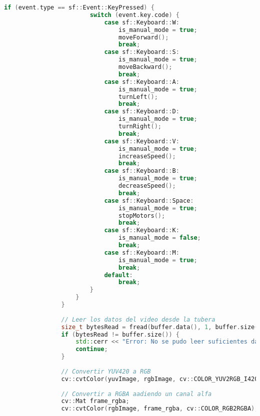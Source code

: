 \begin{lstlisting}[language={C++}, caption={Primer ajuste de c\'odigo}, label={Script}]
                    if (event.type == sf::Event::KeyPressed) {
                        switch (event.key.code) {
                            case sf::Keyboard::W:
                                is_manual_mode = true;
                                moveForward();
                                break;
                            case sf::Keyboard::S:
                                is_manual_mode = true;
                                moveBackward();
                                break;
                            case sf::Keyboard::A:
                                is_manual_mode = true;
                                turnLeft();
                                break;
                            case sf::Keyboard::D:
                                is_manual_mode = true;
                                turnRight();
                                break;
                            case sf::Keyboard::V:
                                is_manual_mode = true;
                                increaseSpeed();
                                break;
                            case sf::Keyboard::B:
                                is_manual_mode = true;
                                decreaseSpeed();
                                break;
                            case sf::Keyboard::Space:
                                is_manual_mode = true;
                                stopMotors();
                                break;
                            case sf::Keyboard::K:
                                is_manual_mode = false;
                                break;
                            case sf::Keyboard::M:
                                is_manual_mode = true;
                                break;
                            default:
                                break;
                        }
                    }
                }
        
                // Leer los datos del video desde la tubera
                size_t bytesRead = fread(buffer.data(), 1, buffer.size(), pipe);
                if (bytesRead != buffer.size()) {
                    std::cerr << "Error: No se pudo leer suficientes datos de video." << std::endl;
                    continue;
                }
        
                // Convertir YUV420 a RGB
                cv::cvtColor(yuvImage, rgbImage, cv::COLOR_YUV2RGB_I420);
        
                // Convertir a RGBA aadiendo un canal alfa
                cv::Mat frame_rgba;
                cv::cvtColor(rgbImage, frame_rgba, cv::COLOR_RGB2RGBA);
        

\end{lstlisting}
